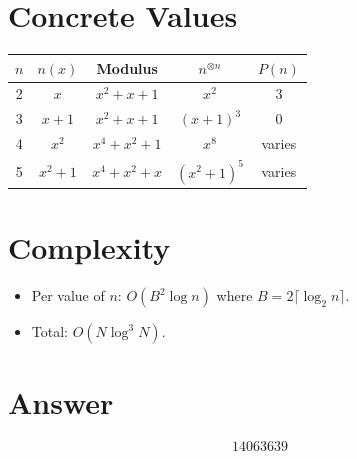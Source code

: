 \documentclass[11pt]{article}
\begin{document}
\section{Concrete Values}

\begin{center}
\begin{tabular}{ccccc}
\toprule
$n$ & $n(x)$ & Modulus & $n^{\otimes n}$ & $P(n)$ \\
\midrule
2 & $x$ & $x^2+x+1$ & $x^2$ & $3$ \\
3 & $x+1$ & $x^2+x+1$ & $(x+1)^3$ & $0$ \\
4 & $x^2$ & $x^4+x^2+1$ & $x^8$ & varies \\
5 & $x^2+1$ & $x^4+x^2+x$ & $(x^2+1)^5$ & varies \\
\bottomrule
\end{tabular}
\end{center}

\section{Complexity}

\begin{itemize}
\item Per value of $n$: $O(B^2 \log n)$ where $B = 2\lceil\log_2 n\rceil$.
\item Total: $O(N \log^3 N)$.
\end{itemize}

\section{Answer}

\[
\boxed{14063639}
\]
\end{document}
